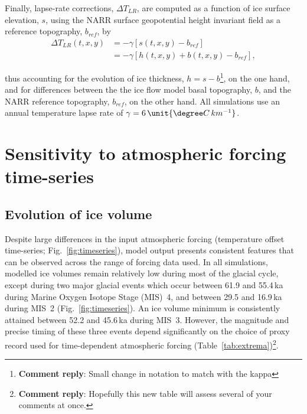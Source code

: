 \documentclass[tc, manuscript]{copernicus}
\newcommand{\renote}[1]{\footnote{\textbf{Comment reply}: #1}}
\begin{document}
Finally, lapse-rate corrections, ${\Delta}T_{LR}$, are computed as a function
of ice surface elevation, $s$, using the NARR surface geopotential height
invariant field as a reference topography, $b_{ref}$, by
\begin{align}
    {\Delta}T_{LR}(t, x, y) &= -\gamma [s(t, x, y)-b_{ref}] \\
                            &= -\gamma [h(t, x, y)+b(t, x, y)-b_{ref}],
\end{align}

thus accounting for the evolution of ice thickness, ${h=s-b}$\renote{
    Small change in notation to match with the kappa},
on the one hand, and
for differences between the the ice flow model basal topography, $b$, and the
NARR reference topography, $b_{ref}$, on the other hand. All simulations use an
annual temperature lapse rate of $\gamma = 6\,\unit{{\degree}C\,km^{-1}}$.

\section{Sensitivity to atmospheric forcing time-series}
\label{sec:results}

\subsection{Evolution of ice volume}

Despite large differences in the input atmospheric forcing (temperature offset
time-series; Fig.~\ref{fig:timeseries}), model output presents consistent
features that can be observed across the range of forcing data used. In all
simulations, modelled ice volumes remain relatively low during most of the
glacial cycle, except during two major glacial events which occur between 61.9
and 55.4\,ka during Marine Oxygen Isotope Stage (MIS)~4, and between 29.5 and
16.9\,ka during MIS~2 (Fig.~\ref{fig:timeseries}). An ice volume minimum is
consistently attained between 52.2 and 45.6\,ka during MIS~3. However, the
magnitude and precise timing of these three events depend significantly on the
choice of proxy record used for time-dependent atmospheric forcing
(Table~\ref{tab:extrema})\renote{
    Hopefully this new table will assess several of your comments at once.}.
\end{document}
